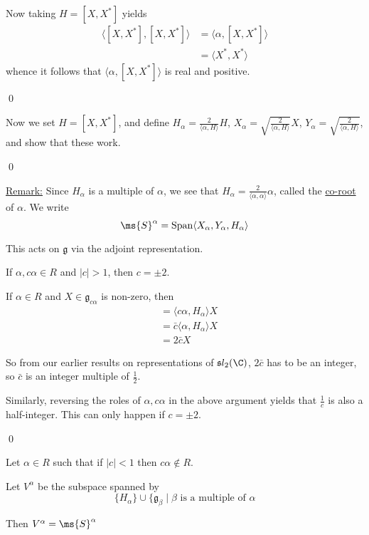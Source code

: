 \documentclass[x11names,reqno,14pt]{extarticle}
\newcommand{\mk}[1]{\mathfrak{#1}}
\newcommand{\g}{\mk{g}}
\begin{document}
Now taking $H = [X,X^*]$ yields 
\begin{align*}
\langle[X,X^*],[X,X^*]\rangle &= \langle\alpha,[X,X^*]\rangle \\& = \langle X^*,X^*\rangle
\end{align*}
whence it follows that $\langle\alpha,[X,X^*]\rangle$ is real and positive. 

\qed

Now we set $H = [X,X^*]$, and define $H_\alpha = \frac{2}{\langle\alpha,H\rangle}H$, $X_\alpha = \sqrt{\frac{2}{\langle\alpha,H\rangle}}X$, $Y_\alpha = \sqrt{\frac{2}{\langle\alpha,H\rangle}}$, and show that these work. 

\qed

\underline{Remark:} Since $H_\alpha$ is a multiple of $\alpha$, we see that $H_\alpha = \frac{2}{\langle\alpha,\alpha\rangle}\alpha$, called the \underline{co-root} of $\alpha$. We write
\[
\ms{S}^\alpha = \operatorname{Span}\langle X_\alpha,Y_\alpha,H_\alpha\rangle
\]

This acts on $\g$ via the adjoint representation. 

\lem

If $\alpha,c\alpha\in R$ and $|c|>1$, then $c = \pm2$.

\proof

If $\alpha\in R$ and $X\in\g_{c\alpha}$ is non-zero, then 
\begin{align*}
[H_\alpha,X] & = \langle c\alpha, H_\alpha\rangle X \\
& = \bar{c}\langle \alpha,H_\alpha\rangle X\\&=2\bar{c}X 
\end{align*}

So from our earlier results on representations of $\mk{s}l_2(\C)$, $2\bar{c}$ has to be an integer, so $\bar{c}$ is an integer multiple of $\frac12$. 

Similarly, reversing the roles of $\alpha,c\alpha$ in the above argument yields that $\frac{1}{c}$ is also a half-integer. This can only happen if $c=\pm2$. 

\qed

\lem

Let $\alpha\in R$ such that if $|c|<1$ then $c\alpha\not\in R$. 

Let $V^\alpha$ be the subspace spanned by 
\[
\{H_\alpha\} \cup \{\g_\beta \mid \beta\text{ is a multiple of }\alpha 
\]

Then $V^\alpha = \ms{S}^\alpha$

\proof
\end{document}
